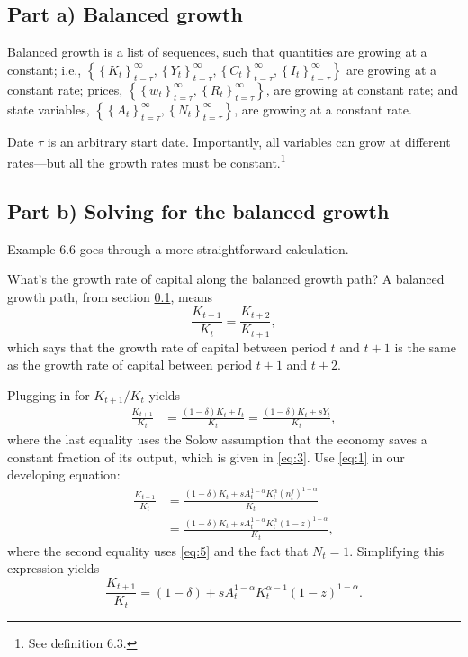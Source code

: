\documentclass[12pt]{pracjourn_rwr}
\theoremstyle{definition}
\theoremstyle{remark}
\begin{document}
\subsection{Part a) Balanced growth}
\label{sec:part-a}

Balanced growth is a list of sequences,
such that quantities are growing at a constant; i.e.,
$\left\{
\left\{ K_{t} \right\}_{t=\tau}^{\infty},
\left\{ Y_{t} \right\}_{t=\tau}^{\infty},
\left\{ C_{t} \right\}_{t=\tau}^{\infty},
\left\{ I_{t} \right\}_{t=\tau}^{\infty} \right\}$
are growing at a constant rate;
prices,
$\left\{ \left\{ w_{t} \right\}_{t=\tau}^{\infty}, \left\{ R_{t} \right\}_{t=\tau}^{\infty} \right\}$,
are growing at constant rate; and
state variables,
$\left\{ \left\{ A_{t} \right\}_{t=\tau}^{\infty},
\left\{ N_{t} \right\}_{t=\tau}^{\infty} \right\}$,
are growing at a constant rate.

Date $\tau$ is an arbitrary start date.
Importantly, all variables can grow at different rates---but all the growth rates must be constant.\footnote{See definition 6.3.}

\subsection{Part b) Solving for the balanced growth}

Example 6.6 goes through a more straightforward calculation.

What's the growth rate of capital along the balanced growth path?
A balanced growth path, from section \ref{sec:part-a}, means
\begin{equation}
\label{eq:8}
\frac{K_{t+1}}{K_{t}} = \frac{K_{t+2}}{K_{t+1}},
\end{equation}
which says that the growth rate of capital between period $t$ and $t+1$ is the same as
the growth rate of capital between period $t+1$ and $t+2$.

Plugging in for $K_{t+1} / K_{t}$ yields
\begin{align*}
\frac{K_{t+1}}{K_{t}} &= \frac{(1-\delta)K_{t} + I_{t}}{K_{t}} = \frac{(1-\delta)K_{t} + sY_{t}}{K_{t}},
\end{align*}
where the last equality uses the Solow assumption that the economy saves a constant fraction of its output,
which is given in \eqref{eq:3}.
Use \eqref{eq:1} in our developing equation:
\begin{align*}
\frac{K_{t+1}}{K_{t}} &=
\frac{(1-\delta)K_{t} + sA_{t}^{1-\alpha}K_{t}^{\alpha} \left( n_{t}^{f} \right)^{1-\alpha}}{K_{t}} \\
&=
\frac{(1-\delta)K_{t} + sA_{t}^{1-\alpha}K_{t}^{\alpha} \left( 1-z \right)^{1-\alpha}}{K_{t}},
\end{align*}
where the second equality uses \eqref{eq:5} and the fact that $N_{t} = 1$.
Simplifying this expression yields
\begin{equation}
\label{eq:9}
\frac{K_{t+1}}{K_{t}} =
(1-\delta) + sA_{t}^{1-\alpha}K_{t}^{\alpha-1} \left( 1-z \right)^{1-\alpha}.
\end{equation}
\end{document}

